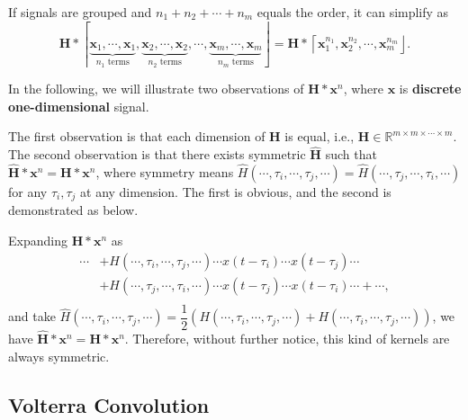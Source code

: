 \documentclass[twoside,11pt]{article}
\def\tvar#1{\mathbf{#1}} %
\def\tvarhat#1{\widehat{\mathbf{#1}}} %
\def\lcerfl#1{\left\lceil{#1}\right\rfloor}
\begin{document}
If signals are grouped and \(n_1 + n_2 + \cdots + n_m\) equals the order, it can simplify as
\begin{equation*}
  \tvar{H} * \lcerfl{
    \underbrace{\tvar{x}_1, \cdots, \tvar{x}_1}_{n_1 \text{ terms}},
    \underbrace{\tvar{x}_2, \cdots, \tvar{x}_2}_{n_2 \text{ terms}},
    \cdots,
    \underbrace{\tvar{x}_m, \cdots, \tvar{x}_m}_{n_m \text{ terms}}
  } = \tvar{H} * \lcerfl{
  \tvar{x}_1^{n_1},
  \tvar{x}_2^{n_2},
  \cdots,
  \tvar{x}_m^{n_m}
  }.
\end{equation*}


In the following, we will illustrate two observations of \(\tvar{H} * \tvar{x}^n\), where \(\tvar{x}\) is \textbf{discrete one-dimensional} signal.

The first observation is that each dimension of \(\tvar{H}\) is equal, i.e., \(\tvar{H} \in \mathbb{R}^{m \times m \times \cdots \times m}\).
The second observation is that there exists symmetric \(\tvarhat{H}\) such that \(\tvarhat{H} * \tvar{x}^n = \tvar{H} * \tvar{x}^n\), where symmetry means \(\hat{H}(\cdots, \tau_i, \cdots, \tau_j, \cdots) = \hat{H}(\cdots, \tau_j, \cdots, \tau_i, \cdots)\) for any \(\tau_i, \tau_j\) at any dimension.
The first is obvious, and the second is demonstrated as below.

Expanding \(\tvar{H} * \tvar{x}^n\) as
\begin{equation*}
  \begin{aligned}
    \cdots
     & + H(\cdots, \tau_i, \cdots, \tau_j, \cdots) \cdots x(t - \tau_i) \cdots x(t - \tau_j) \cdots \\
     & + H(\cdots, \tau_j, \cdots, \tau_i, \cdots) \cdots x(t - \tau_j) \cdots x(t - \tau_i) \cdots
    + \cdots,                                                                                       \\
  \end{aligned}
\end{equation*}
and take \(\hat{H}(\cdots, \tau_i, \cdots, \tau_j, \cdots) = \dfrac{1}{2}\left(
H(\cdots, \tau_i, \cdots, \tau_j, \cdots) +
H(\cdots, \tau_i, \cdots, \tau_j, \cdots)
\right)\), we have \(\tvarhat{H} * \tvar{x}^n = \tvar{H} * \tvar{x}^n\). Therefore, without further notice, this kind of kernels are always symmetric.

\subsection{Volterra Convolution}
\label{subsec:voltarra-convolution}
\end{document}
